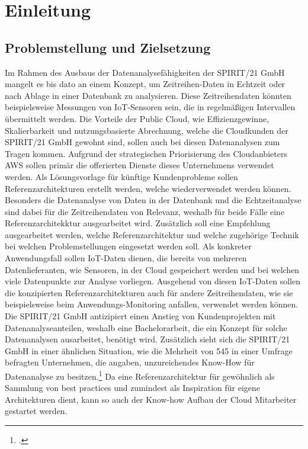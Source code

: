 \chapter{Einleitung}

\section{Problemstellung und Zielsetzung}
Im Rahmen des Ausbaus der Datenanalysefähigkeiten der SPIRIT/21 GmbH mangelt es bis dato an einem Konzept, um
Zeitreihen-Daten in Echtzeit oder nach Ablage in einer Datenbank zu analysieren. 
Diese Zeitreihendaten könnten beispielsweise Messungen von \ac{IoT}-Sensoren sein, die in regelmäßigen Intervallen übermittelt werden. Die Vorteile der Public Cloud, wie Effizienzgewinne, Skalierbarkeit und nutzungsbasierte Abrechnung, welche die Cloudkunden der SPIRIT/21 GmbH gewohnt sind, sollen auch bei diesen Datenanalysen zum Tragen kommen. 
Aufgrund der strategischen Priorisierung des Cloudanbieters \ac{AWS} sollen primär die offerierten Dienste dieses Unternehmens verwendet werden.
Als Lösungsvorlage für künftige Kundenprobleme sollen Referenzarchitekturen erstellt werden, welche wiederverwendet werden können. 
Besonders die Datenanalyse von Daten in der Datenbank und die Echtzeitanalyse sind dabei für die
Zeitreihendaten von Relevanz, weshalb für beide Fälle eine Referenzarchitekktur ausgearbeitet wird.
Zusätzlich soll eine Empfehlung ausgearbeitet werden, welche Referenzarchitektur und welche
zugehörige Technik bei welchen Problemstellungen eingesetzt werden soll. Als konkreter Anwendungsfall sollen \ac{IoT}-Daten dienen, die bereits von mehreren Datenlieferanten, wie Sensoren, in der Cloud gespeichert werden und bei welchen viele Datenpunkte zur Analyse vorliegen. Ausgehend von diesen \ac{IoT}-Daten sollen die konzipierten Referenzarchitekturen auch für andere Zeitreihendaten, wie sie beispielsweise beim Anwendungs-Monitoring anfallen, verwendet werden können. 
Die SPIRIT/21 GmbH antizipiert einen Anstieg von Kundenprojekten mit Datenanalyseanteilen, weshalb eine Bachelorarbeit, die ein Konzept für solche Datenanalysen ausarbeitet, benötigt wird. Zusätzlich sieht sich die SPIRIT/21 GmbH in einer ähnlichen Situation, wie die Mehrheit von 545 in einer Umfrage befragten Unternehmen, die angaben, unzureichendes Know-How für Datenanalyse zu besitzen.\footcite[Vgl.][]{o.V..o.J.} Da eine Referenzarchitektur für gewöhnlich als Sammlung von best practices und zumindest als Inspiration für eigene Architekturen dient, kann so auch der Know-how Aufbau der Cloud Mitarbeiter gestartet werden.

